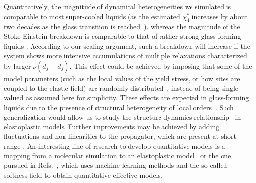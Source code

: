 \documentclass[pre,twocolumn,superscriptaddress,tightenlines,showpacs,longbibliography,floatfix,footinbib]{revtex4-1}
\begin{document}
Quantitatively, the magnitude of dynamical heterogeneities we simulated is comparable to most super-cooled liquids (as the estimated $\chi_4^*$ increases by about two decades as the glass transition is reached~\cite{dalle2007spatial,dauchot2022glass}), whereas the magnitude of the Stoke-Einstein breakdown is comparable to that of rather strong glass-forming liquids \cite{ediger2000spatially}.
According to our scaling argument, such a breakdown will increase if the system shows more intensive accumulations of multiple relaxations characterized by larger $\nu(d_f-\tilde d_f)$.
This effect could be achieved by imposing that some of the model parameters (such as the local values of the yield stress, or how sites are coupled to the elastic field) are randomly distributed~\cite{agoritsas2015relevance}, instead of being single-valued as assumed here for simplicity. These effects are expected in glass-forming liquids due to the presence of structural heterogeneity of local orders~\cite{tanaka2010critical,royall2015role,tanaka2019revealing,paret2020assessing}. Such generalization would allow us to study the structure-dynamics relationship~\cite{widmer2004reproducible,widmer2008irreversible,hocky2014correlation} in elastoplastic models.
Further improvements may be achieved by adding fluctuations and non-linearities to the propagator, which are present at short-range \cite{lemaitre2021anomalous,Lerner14}. An interesting line of research to develop quantitative models is a
mapping from a molecular simulation to an elastoplastic
model~\cite{liu2021elastoplastic,castellanos2021insights,castellanos2022history}
or the one pursued in Refs.~\cite{tah2022fragility,xiao2023machine}, which uses machine learning methods and the so-called softness field to obtain quantitative effective models.



\end{document}
